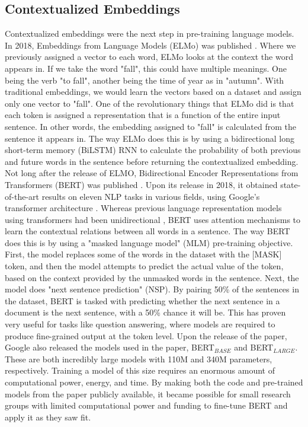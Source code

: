 \subsection{Contextualized Embeddings}
Contextualized embeddings were the next step in pre-training language models. In 2018, Embeddings from Language Models (ELMo) was published \cite{Peters:2018}. Where we previously assigned a vector to each word, ELMo looks at the context the word appears in. If we take the word "fall", this could have multiple meanings. One being the verb "to fall", another being the time of year as in "autumn". With traditional embeddings, we would learn the vectors based on a dataset and assign only one vector to "fall". One of the revolutionary things that ELMo did is that each token is assigned a representation that is a function of the entire input sentence. In other words, the embedding assigned to "fall" is calculated from the sentence it appears in. The way ELMo does this is by using a bidirectional long short-term memory (BiLSTM) RNN to calculate the probability of both previous and future words in the sentence before returning the contextualized embedding.\\
Not long after the release of ELMO, Bidirectional Encoder Representations from Transformers (BERT) was published \cite{DBLP:journals/corr/abs-1810-04805}. Upon its release in 2018, it obtained state-of-the-art results on eleven NLP tasks in various fields, using Google's transformer architecture \cite{DBLP:journals/corr/VaswaniSPUJGKP17}. Whereas previous language representation models using transformers had been unidirectional \cite{radford2018improving}, BERT uses attention mechanisms to learn the contextual relations between all words in a sentence. The way BERT does this is by using a "masked language model" (MLM) pre-training objective. First, the model replaces some of the words in the dataset with the [MASK] token, and then the model attempts to predict the actual value of the token, based on the context provided by the unmasked words in the sentence. Next, the model does "next sentence prediction" (NSP). By pairing 50\% of the sentences in the dataset, BERT is tasked with predicting whether the next sentence in a document is the next sentence, with a 50\% chance it will be. This has proven very useful for tasks like question answering, where models are required to produce fine-grained output at the token level. Upon the release of the paper, Google also released the models used in the paper, BERT$_{BASE}$ and BERT$_{LARGE}$. These are both incredibly large models with 110M and 340M parameters, respectively. Training a model of this size requires an enormous amount of computational power, energy, and time. By making both the code and pre-trained models from the paper publicly available, it became possible for small research groups with limited computational power and funding to fine-tune BERT and apply it as they saw fit.
